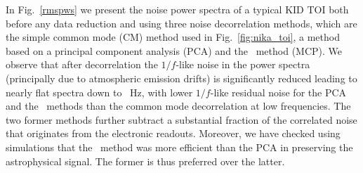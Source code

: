 In Fig.~\ref{rmspws} we present the noise power spectra of
a typical KID TOI both before any data reduction and using three noise
decorrelation methods, which are the simple common mode (CM) method
used in Fig.~\ref{fig:nika_toi}, a method based on a principal component
analysis (PCA) and the \cmoneb\ method (MCP). We observe that after decorrelation the
$1/f$-like noise in the power spectra (principally due to atmospheric
emission drifts)
is significantly reduced leading to nearly flat spectra down to {~Hz}, with lower $1/f$-like residual noise for the PCA and
the \cmoneb\ methods than the common mode decorrelation at low
frequencies. {\rev The two former methods further subtract a
substantial fraction of the correlated noise that originates from the
electronic readouts.} {\lp Moreover, we have checked using simulations that
the \cmoneb\ method was more efficient than the PCA in preserving the
astrophysical signal. The former is thus preferred over the latter.} 


